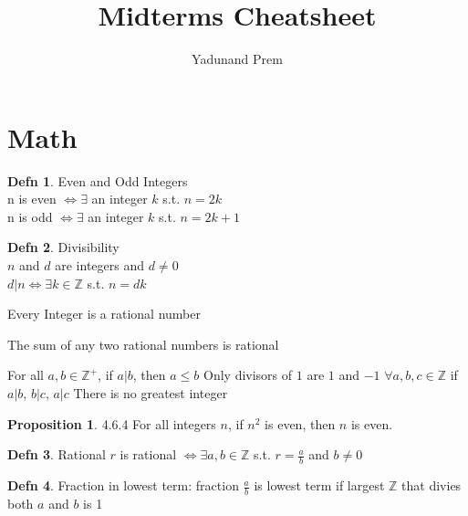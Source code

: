\documentclass[a4paper]{article}
\author{Yadunand Prem}
\title{Midterms Cheatsheet}
\theoremstyle{definition}
\newtheorem*{defn}{Defn}
\newtheorem*{propos}{Proposition}
\newenvironment{theorem}[1]
  {\renewcommand\theinnertheorem{#1}\innertheorem}
  {\endinnertheorem}
\begin{document}
\section{Math}

\begin{defn}{Even and Odd Integers}\\
  n is even $\Leftrightarrow \exists$ an integer $k$ s.t. $n = 2k$\\
  n is odd $\Leftrightarrow \exists$ an integer $k$ s.t. $n = 2k + 1$
\end{defn}

\begin{defn}{Divisibility}\\
  $n$ and $d$ are integers and $d \not= 0$ \\
  $d | n \Leftrightarrow \exists k \in \mathbb{Z}$ s.t. $n = dk$
\end{defn}

\begin{theorem}{4.2.1}
  Every Integer is a rational number
\end{theorem}

\begin{theorem}{4.2.2}
  The sum of any two rational numbers is rational
\end{theorem}

\begin{theorem}{4.3.1}
  For all $a, b \in \mathbb{Z}^+$, if $a | b$, then $a \leq b$
\end{theorem}
\begin{theorem}{4.3.2}
  Only divisors of $1$ are $1$ and $-1$
\end{theorem}
\begin{theorem}{4.3.3}
  $\forall a, b, c \in \mathbb{Z}$ if $a | b$, $b | c$, $a | c$
\end{theorem}
\begin{theorem}{4.6.1}
  There is no greatest integer
\end{theorem}
\begin{propos}{4.6.4}
  For all integers $n$, if $n^2$ is even, then $n$ is even.
\end{propos}

\begin{defn}{Rational}
  $r$ is rational $\Leftrightarrow \exists a, b \in \mathbb{Z}$ s.t. $r = \frac{a}{b}$ and $b \not=0$
\end{defn}
\begin{defn}{Fraction in lowest term:}
fraction $\frac{a}{b}$ is lowest term if largest $\mathbb{Z}$ that divies both $a$ and $b$ is 1
\end{defn}
\end{document}
